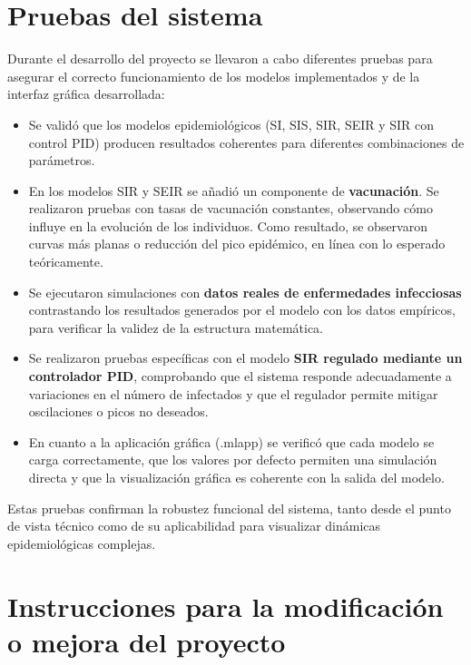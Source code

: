 \section{Pruebas del sistema}
Durante el desarrollo del proyecto se llevaron a cabo diferentes pruebas para asegurar el correcto funcionamiento de los modelos implementados y de la interfaz gráfica desarrollada:

\begin{itemize}
    \item Se validó que los modelos epidemiológicos (SI, SIS, SIR, SEIR y SIR con control PID) producen resultados coherentes para diferentes combinaciones de parámetros.

    \item En los modelos SIR y SEIR se añadió un componente de \textbf{vacunación}. Se realizaron pruebas con tasas de vacunación constantes, observando cómo influye en la evolución de los individuos. Como resultado, se observaron curvas más planas o reducción del pico epidémico, en línea con lo esperado teóricamente.

    \item Se ejecutaron simulaciones con \textbf{datos reales de enfermedades infecciosas} contrastando los resultados generados por el modelo con los datos empíricos, para verificar la validez de la estructura matemática.

    \item Se realizaron pruebas específicas con el modelo \textbf{SIR regulado mediante un controlador PID}, comprobando que el sistema responde adecuadamente a variaciones en el número de infectados y que el regulador permite mitigar oscilaciones o picos no deseados.

    \item En cuanto a la aplicación gráfica (.mlapp) se verificó que cada modelo se carga correctamente, que los valores por defecto permiten una simulación directa y que la visualización gráfica es coherente con la salida del modelo.

    
\end{itemize}

Estas pruebas confirman la robustez funcional del sistema, tanto desde el punto de vista técnico como de su aplicabilidad para visualizar dinámicas epidemiológicas complejas.

\section{Instrucciones para la modificación o mejora del proyecto}

